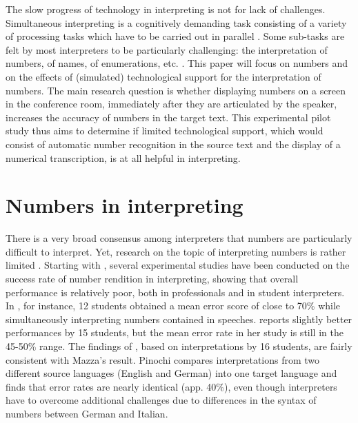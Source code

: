 \documentclass[output=paper]{langsci/langscibook}
\begin{document}
The slow progress of technology in interpreting is not for lack of challenges. Simultaneous interpreting is a cognitively demanding task consisting of a variety of processing tasks which have to be carried out in parallel \citep{Gile1995, Seeber2011a}. Some sub-tasks are felt by most interpreters to be particularly challenging: the interpretation of numbers, of names, of enumerations, etc. \citep{Gile2009}. This paper will focus on numbers and on the effects of (simulated) technological support for the interpretation of numbers. The main research question is whether displaying numbers on a screen in the conference room, immediately after they are articulated by the speaker, increases the accuracy of numbers in the target text. This experimental pilot study thus aims to determine if limited technological support, which would consist of automatic number recognition in the source text and the display of a numerical transcription, is at all helpful in interpreting.

\section{Numbers in interpreting}

There is a very broad consensus among interpreters that numbers are particularly difficult to interpret. Yet, research on the topic of interpreting numbers is rather limited \citep[287]{Mead2015}. Starting with \citet{Braun1996}, several experimental studies have been conducted on the success rate of number rendition in interpreting, showing that overall performance is relatively poor, both in professionals and in student interpreters. In \citet{Braun1996}, for instance, 12 students obtained a mean error score of close to 70\% while simultaneously interpreting numbers contained in speeches. \citet{Mazza2001} reports slightly better performances by 15 students, but the mean error rate in her study is still in the 45-50\% range. The findings of \citet{Pinochi2009}, based on interpretations by 16 students, are fairly consistent with Mazza’s result. Pinochi compares interpretations from two different source languages (English and German) into one target language and finds that error rates are nearly identical (app. 40\%), even though interpreters have to overcome additional challenges due to differences in the syntax of numbers between German and Italian.
\end{document}
